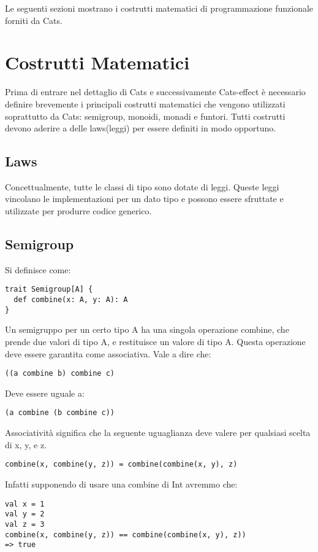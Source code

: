 \noindent Le seguenti sezioni mostrano i costrutti matematici di programmazione funzionale forniti da Cats.

\section{Costrutti Matematici}

Prima di entrare nel dettaglio di Cats e successivamente Cats-effect è necessario definire brevemente i principali costrutti matematici che vengono utilizzati soprattutto da Cats: semigroup, monoidi, monadi e funtori. Tutti costrutti devono aderire a delle laws(leggi) per essere definiti in modo opportuno.

\subsection{Laws}
Concettualmente, tutte le classi di tipo sono dotate di leggi. Queste leggi vincolano le implementazioni per un dato tipo e possono essere sfruttate e utilizzate per produrre codice generico.

\subsection{Semigroup}
Si definisce come:
\begin{verbatim}
trait Semigroup[A] {
  def combine(x: A, y: A): A
}
\end{verbatim}

\noindent Un semigruppo per un certo tipo A ha una singola operazione combine, che prende due valori di tipo A, e restituisce un valore di tipo A. Questa operazione deve essere garantita come associativa. Vale a dire che:
\begin{verbatim}
((a combine b) combine c)
\end{verbatim}
Deve essere uguale a:
\begin{verbatim}
(a combine (b combine c))
\end{verbatim}

\noindent Associatività significa che la seguente uguaglianza deve valere per qualsiasi scelta di x, y, e z.
\begin{verbatim}
combine(x, combine(y, z)) = combine(combine(x, y), z)
\end{verbatim}

\noindent Infatti supponendo di usare una combine di Int avremmo che:
\begin{verbatim}
val x = 1
val y = 2
val z = 3
combine(x, combine(y, z)) == combine(combine(x, y), z))
=> true
\end{verbatim}
